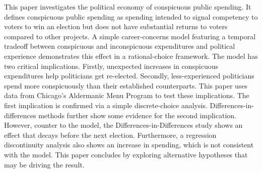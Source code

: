 \begin{spacing}{1.0}
This paper investigates the political economy of conspicuous public spending. 
It defines conspicuous public spending as spending intended to signal competency to voters to win an election but does not have substantial returns to voters compared to other projects. 
A simple career-concerns model featuring a temporal tradeoff between conspicuous and inconspicuous expenditures and political experience demonstrates this effect in a rational-choice framework. 
The model has two critical implications. 
Firstly, unexpected increases in conspicuous expenditures help politicians get re-elected. 
Secondly, less-experienced politicians spend more conspicuously than their established counterparts. 
This paper uses data from Chicago's Aldermanic Menu Program to test these implications. 
The first implication is confirmed via a simple discrete-choice analysis. Differences-in-differences methods further show some evidence for the second implication. 
However, counter to the model, the Differences-in-Differences study shows an effect that decays before the next election.
Furthermore, a regression discontinuity analysis also shows an increase in spending, which is not consistent with the model.
This paper concludes by exploring alternative hypotheses that may be driving the result. 
\end{spacing}